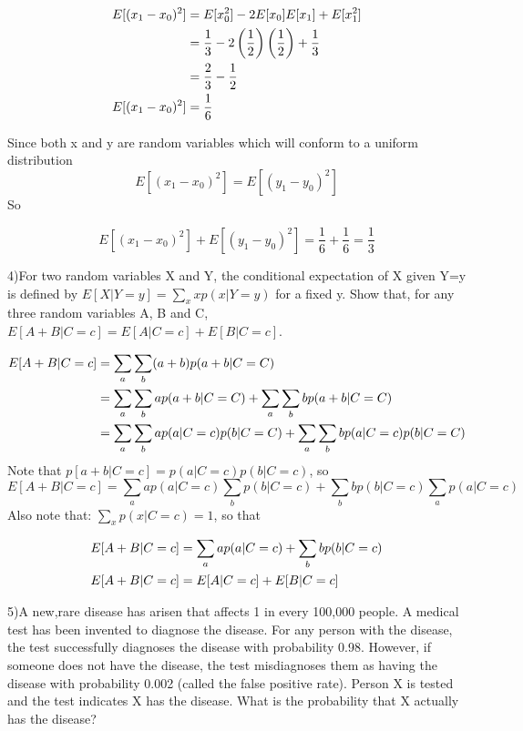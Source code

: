\documentclass[12pt]{article}
\begin{document}
\begin{align}
    E[(x_1-x_0)^2] &= E[x_0^2]-2E[x_0]E[x_1]+E[x_1^2] \notag \\
                   &= \frac{1}{3} - 2\left(\frac{1}{2}\right)\left(\frac{1}{2}\right) + \frac{1}{3} \notag \\
                   &= \frac{2}{3} - \frac{1}{2} \notag \\
    E[(x_1-x_0)^2] &= \frac{1}{6}
\end{align}

Since both x and y are random variables which will conform to a uniform distribution
\begin{equation}
    E[(x_1-x_0)^2] = E[(y_1-y_0)^2]
\end{equation}
So 

\begin{equation}
    E[(x_1-x_0)^2] + E[(y_1-y_0)^2] = \frac{1}{6} + \frac{1}{6} = \frac{1}{3}
\end{equation}

\pagebreak
\setcounter{equation}{0}
4)For two random variables X and Y, the conditional expectation of X given Y=y 
is defined by $E[X|Y=y]= \sum_x xp(x|Y=y)$ for a fixed y. Show that, for any three 
random variables A, B and C, $E[A+B|C=c]=E[A|C=c]+E[B|C=c]$.

\begin{align}
    E[A+B|C=c] &= \sum_a \sum_b (a+b)p(a+b|C=C) \\
               &= \sum_a \sum_b ap(a+b|C=C) + \sum_a \sum_b bp(a+b|C=C) \notag \\
               &= \sum_a \sum_b ap(a|C=c)p(b|C=C) + \sum_a \sum_b bp(a|C=c)p(b|C=C) \notag
\end{align}
Note that $p[a+b|C=c] = p(a|C=c)p(b|C=c)$, so
\begin{equation}
            E[A+B|C=c]   = \sum_a ap(a|C=c) \sum_b p(b|C=c) + \sum_b bp(b|C=c) \sum_a p(a|C=c)
\end{equation}
Also note that: 
$\sum_x p(x|C=c) = 1$, so that

\begin{align}
            E[A+B|C=c]   &= \sum_a ap(a|C=c) + \sum_b bp(b|C=c) \notag \\
            E[A+B|C=c]   &= E[A|C=c] + E[B|C=c] 
\end{align}

\pagebreak
\setcounter{equation}{0}
5)A new,rare disease has arisen that affects 1 in every 100,000 people. A medical 
test has been invented to diagnose the disease. For any person with the disease, 
the test successfully diagnoses the disease with probability 0.98. However, if 
someone does not have the disease, the test misdiagnoses them as having the 
disease with probability 0.002 (called the false positive rate). Person X is 
tested and the test indicates X has the disease. What is the probability that X 
actually has the disease? 
\end{document}
